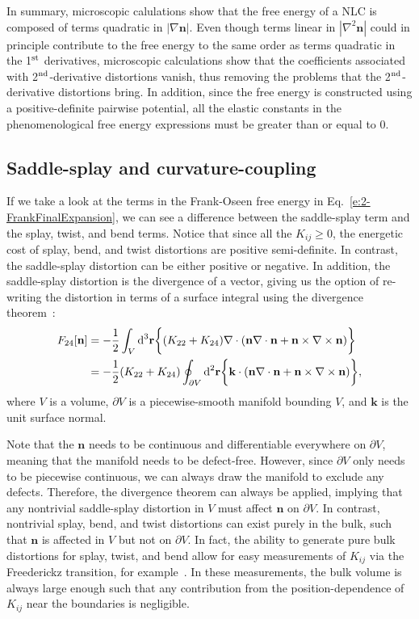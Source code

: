 In summary, microscopic calulations show that the free energy of a NLC is composed of terms quadratic in $|\nabla \mathbf{n}|$.
Even though terms linear in $|\nabla ^2 \mathbf{n}|$ could in principle contribute to the free energy to the same order as terms quadratic in the 1$^\textup{\rm st}$ derivatives, microscopic calculations show that the coefficients associated with 2$^\textup{\rm nd}$-derivative distortions vanish, thus removing the problems that the 2$^\textup{\rm nd}$-derivative distortions bring.
In addition, since the free energy is constructed using a positive-definite pairwise potential, all the elastic constants in the phenomenological free energy expressions must be greater than or equal to 0.


\subsection{Saddle-splay and curvature-coupling}
If we take a look at the terms in the Frank-Oseen free energy in Eq.~\ref{e:2-FrankFinalExpansion}, we can see a difference between the saddle-splay term and the splay, twist, and bend terms.
Notice that since all the $K_{ij} \geq 0$, the energetic cost of splay, bend, and twist distortions are positive semi-definite.
In contrast, the saddle-splay distortion can be either positive or negative.
In addition, the saddle-splay distortion is the divergence of a vector, giving us the option of re-writing the distortion in terms of a surface integral using the divergence theorem~\cite{RN230}:
\begin{align}
  F_{24}[\mathbf{n}] &= - \frac{1}{2}\int_{V} \textup{d}^3  \mathbf{r} \bigg \{ (K_{22} + K_{24})  \nabla \cdot (\mathbf{n}\nabla \cdot \mathbf{n} + \mathbf{n} \times \nabla \times \mathbf{n}) \bigg \}\label{e:2-F24GaussA}  \\ &=
  - \frac{1}{2}(K_{22} + K_{24}) \oint_{\partial V} \textup{d}^2  \mathbf{r} \bigg \{   \mathbf{k} \cdot (\mathbf{n}\nabla \cdot \mathbf{n} + \mathbf{n} \times \nabla \times \mathbf{n}) \bigg \},\label{e:2-F24GaussB}
\end{align}
where $V$ is a volume, $\partial V$ is a piecewise-smooth manifold bounding $V$, and $\mathbf{k}$ is the unit surface normal.

Note that the $\mathbf{n}$ needs to be continuous and differentiable everywhere on $\partial V$, meaning that the manifold needs to be defect-free.
However, since $\partial V$ only needs to be piecewise continuous, we can always draw the manifold to exclude any defects.
Therefore, the divergence theorem can always be applied, implying that any nontrivial saddle-splay distortion in $V$ must affect $\mathbf{n}$ on $\partial V$.
In contrast, nontrivial splay, bend, and twist distortions can exist purely in the bulk, such that $\mathbf{n}$ is affected in $V$ but not on $\partial V$.
In fact, the ability to generate pure bulk distortions for splay, twist, and bend allow for easy measurements of $K_{ij}$ via the Freederickz transition, for example~\cite{RN212,RN213,RN33,RN188,RN182,RN183}.
In these measurements, the bulk volume is always large enough such that any contribution from the position-dependence of $K_{ij}$ near the boundaries is negligible.

